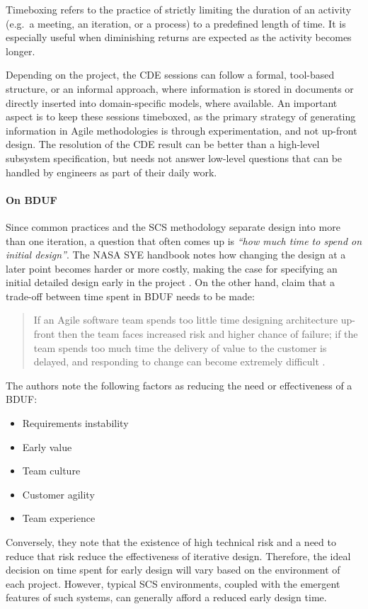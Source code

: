 \documentclass[a4paper,nobib,justified,final]{tufte-book}
\begin{document}
\begin{margindefinition}[Timebox]
	Timeboxing refers to the practice of strictly limiting the duration of an activity (e.g.~a meeting, an iteration, or a process) to a predefined length of time. It is especially useful when diminishing returns are expected as the activity becomes longer.
\end{margindefinition} %
Depending on the project, the \acs{CDE} sessions can follow a formal, tool-based structure, or an informal approach, where information is stored in documents or directly inserted into domain-specific models, where available. An important aspect is to keep these sessions timeboxed, as the primary strategy of generating information in Agile methodologies is through experimentation, and not up-front design. The resolution of the \acs{CDE} result can be better than a high-level subsystem specification, but needs not answer low-level questions that can be handled by engineers as part of their daily work.

\paragraph[On Big Design Up-Front]{On \acf{BDUF}}
Since common practices and the \acs{SCS} methodology separate design into more than one iteration, a question that often comes up is \emph{``how much time to spend on initial design''}.
The \acs{NASA} \acs{SYE} handbook notes how changing the design at a later point becomes harder or more costly, making the case for specifying an initial detailed design early in the project \cite{sheaNASASystemsEngineering2020}.
On the other hand, \citeauthor{watermanHowMuchUpFront2015} \cite{watermanHowMuchUpFront2015} claim that a trade-off between time spent in \acs{BDUF} needs to be made:
\begin{quote}
If an Agile software team spends too little time designing architecture up-front then the team faces increased risk and higher chance of failure; if the team spends too much time the delivery of value to the customer is delayed, and responding to change can become extremely difficult \autocite{watermanHowMuchUpFront2015}.
\end{quote}
The authors note the following factors as reducing the need or effectiveness of a \acl{BDUF}:
\begin{itemize}[itemsep=-3ex]
	\item Requirements instability
	\item Early value
	\item Team culture
	\item Customer agility
	\item Team experience
\end{itemize}
Conversely, they note that the existence of high technical risk and a need to reduce that risk reduce the effectiveness of iterative design. Therefore, the ideal decision on time spent for early design will vary based on the environment of each project. However, typical \acs{SCS} environments, coupled with the emergent features of such systems, can generally afford a reduced early design time.
\end{document}

